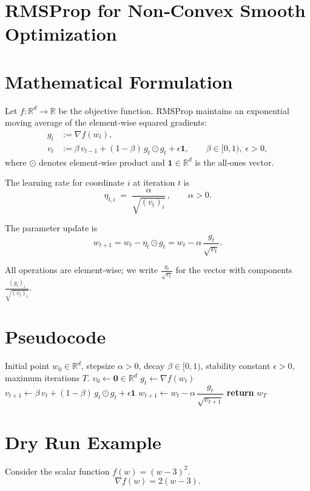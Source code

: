 \documentclass[11pt]{article}
\begin{document}
\section*{RMSProp for Non‑Convex Smooth Optimization}

\section*{Mathematical Formulation}
Let $f:\mathbb{R}^{d}\rightarrow\mathbb{R}$ be the objective function.
RMSProp maintains an exponential moving average of the element‑wise squared
gradients:
\[
\boxed{
\begin{aligned}
g_t &:= \nabla f(w_t),\\[4pt]
v_t &:= \beta\, v_{t-1} + (1-\beta)\, g_t\odot g_t + \epsilon\mathbf{1},
\qquad \beta\in[0,1),\;\epsilon>0,
\end{aligned}}
\]
where $\odot$ denotes element‑wise product and $\mathbf{1}\in\mathbb{R}^{d}$
is the all‑ones vector.

The learning rate for coordinate $i$ at iteration $t$ is
\[
\eta_{t,i} \;=\; \frac{\alpha}{\sqrt{(v_t)_i}}\,,\qquad \alpha>0 .
\]

The parameter update is
\[
\boxed{ w_{t+1}= w_t - \eta_t\odot g_t
        = w_t - \alpha\,\frac{g_t}{\sqrt{v_t}} } .
\]

All operations are element‑wise; we write
$\frac{g_t}{\sqrt{v_t}}$ for the vector with components
$\frac{(g_t)_i}{\sqrt{(v_t)_i}}$.

\section*{Pseudocode}
\begin{algorithm}[H]
\caption{RMSProp (Non‑Convex Setting)}\label{alg:rmsprop}
\begin{algorithmic}[1]
\Require Initial point $w_0\in\mathbb{R}^d$, stepsize $\alpha>0$,
        decay $\beta\in[0,1)$, stability constant $\epsilon>0$,
        maximum iterations $T$.
\State $v_0 \gets \mathbf{0}\in\mathbb{R}^d$
    \State $g_t \gets \nabla f(w_t)$
    \State $v_{t+1} \gets \beta\,v_t + (1-\beta)\,g_t\odot g_t + \epsilon\mathbf{1}$
    \State $w_{t+1} \gets w_t - \alpha\,\dfrac{g_t}{\sqrt{v_{t+1}}}$
\EndFor
\State \textbf{return} $w_T$
\end{algorithmic}
\end{algorithm}

\section*{Dry Run Example}
Consider the scalar function $f(w)=(w-3)^2$.
\[
\nabla f(w)=2(w-3).
\]
\end{document}
